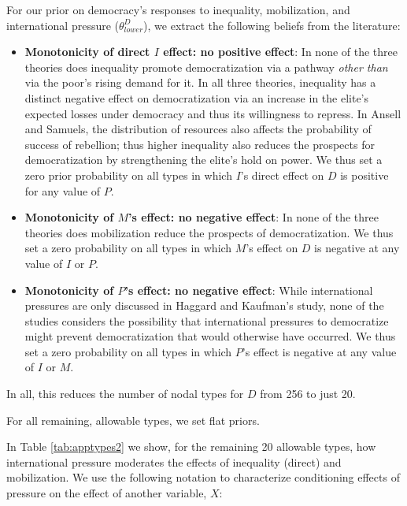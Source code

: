 \documentclass[12pt,]{book}
\begin{document}
For our prior on democracy's responses to inequality, mobilization, and international pressure (\(\theta^D_{lower}\)), we extract the following beliefs from the literature:

\begin{itemize}
\item
  \textbf{Monotonicity of direct \(I\) effect: no positive effect}: In none of the three theories does inequality promote democratization via a pathway \emph{other than} via the poor's rising demand for it. In all three theories, inequality has a distinct negative effect on democratization via an increase in the elite's expected losses under democracy and thus its willingness to repress. In Ansell and Samuels, the distribution of resources also affects the probability of success of rebellion; thus higher inequality also reduces the prospects for democratization by strengthening the elite's hold on power. We thus set a zero prior probability on all types in which \(I\)'s direct effect on \(D\) is positive for any value of \(P\).
\item
  \textbf{Monotonicity of \(M\)'s effect: no negative effect}: In none of the three theories does mobilization reduce the prospects of democratization. We thus set a zero probability on all types in which \(M\)'s effect on \(D\) is negative at any value of \(I\) or \(P\).
\item
  \textbf{Monotonicity of \(P\)'s effect: no negative effect}: While international pressures are only discussed in Haggard and Kaufman's study, none of the studies considers the possibility that international pressures to democratize might prevent democratization that would otherwise have occurred. We thus set a zero probability on all types in which \(P\)'s effect is negative at any value of \(I\) or \(M\).
\end{itemize}

In all, this reduces the number of nodal types for \(D\) from 256 to just 20.

For all remaining, allowable types, we set flat priors.

In Table \ref{tab:apptypes2} we show, for the remaining 20 allowable types, how international pressure moderates the effects of inequality (direct) and mobilization. We use the following notation to characterize conditioning effects of pressure on the effect of another variable, \(X\):
\end{document}
